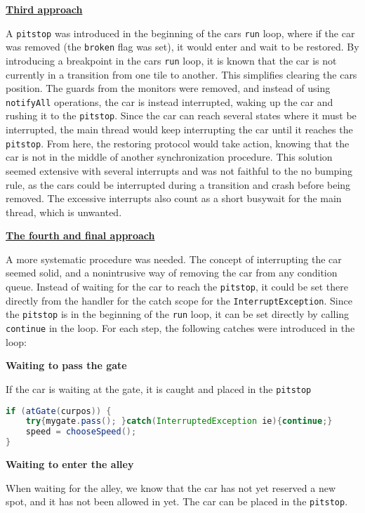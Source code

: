\underline{\textbf{Third approach}}

A \texttt{pitstop} was introduced in the beginning of the cars \texttt{run} loop, where if the car was removed (the \texttt{broken} flag was set), it would enter and wait to be restored. By introducing a breakpoint in the cars \texttt{run} loop, it is known that the car is not currently in a transition from one tile to another. This simplifies clearing the cars position. The guards from the monitors were removed, and instead of using \texttt{notifyAll} operations, the car is instead interrupted, waking up the car and rushing it to the \texttt{pitstop}. Since the car can reach several states where it must be interrupted, the main thread would keep interrupting the car until it reaches the \texttt{pitstop}. From here, the restoring protocol would take action, knowing that the car is not in the middle of another synchronization procedure. This solution seemed extensive with several interrupts and was not faithful to the no bumping rule, as the cars could be interrupted during a transition and crash before being removed. The excessive interrupts also count as a short busywait for the main thread, which is unwanted.

\underline{\textbf{The fourth and final approach}}

A more systematic procedure was needed. The concept of interrupting the car seemed solid, and a nonintrusive way of removing the car from any condition queue. Instead of waiting for the car to reach the \texttt{pitstop}, it could be set there directly from the handler for the catch scope for the \texttt{InterruptException}. Since the \texttt{pitstop} is in the beginning of the \texttt{run} loop, it can be set directly by calling \texttt{continue} in the loop. For each step, the following catches were introduced in the loop:


\textbf{Waiting to pass the gate}

If the car is waiting at the gate, it is caught and placed in the \texttt{pitstop} 

\begin{lstlisting}[language=java]
if (atGate(curpos)) { 
    try{mygate.pass(); }catch(InterruptedException ie){continue;}
    speed = chooseSpeed();
}
\end{lstlisting}

\textbf{Waiting to enter the alley}

When waiting for the alley, we know that the car has not yet reserved a new spot, and it has not been allowed in yet. The car can be placed in the \texttt{pitstop}.

